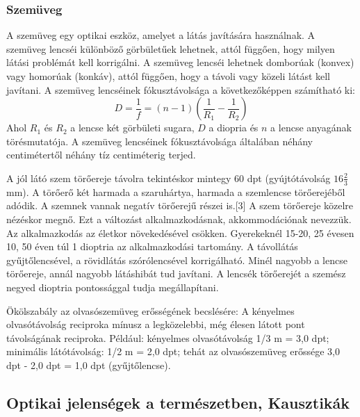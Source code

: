 \documentclass[../main.tex]{subfiles}
\begin{document}
\subsubsection{Szemüveg}
A szemüveg egy optikai eszköz, amelyet a látás javítására használnak. A szemüveg lencséi különböző görbületűek lehetnek, attól függően, hogy milyen látási problémát kell korrigálni. A szemüveg lencséi lehetnek domborúak (konvex) vagy homorúak (konkáv), attól függően, hogy a távoli vagy közeli látást kell javítani.
A szemüveg lencséinek fókusztávolsága a következőképpen számítható ki:
\begin{equation}
    D = \frac{1}{f} = (n - 1) \left(\frac{1}{R_1} - \frac{1}{R_2}\right)
\end{equation}
Ahol $R_1$ és $R_2$ a lencse két görbületi sugara, $D$ a diopria és $n$ a lencse anyagának törésmutatója. A szemüveg lencséinek fókusztávolsága általában néhány centimétertől néhány tíz centiméterig terjed.

A jól látó szem törőereje távolra tekintéskor mintegy 60 dpt (gyújtótávolság $16 \frac{2}{3}$ mm). A törőerő két harmada a szaruhártya, harmada a szemlencse törőerejéből adódik. A szemnek vannak negatív törőerejű részei is.[3] A szem törőereje közelre nézéskor megnő. Ezt a változást alkalmazkodásnak, akkommodációnak nevezzük. Az alkalmazkodás az életkor növekedésével csökken. Gyerekeknél 15-20, 25 évesen 10, 50 éven túl 1 dioptria az alkalmazkodási tartomány.
A távollátás gyűjtőlencsével, a rövidlátás szórólencsével korrigálható. Minél nagyobb a lencse törőereje, annál nagyobb látáshibát tud javítani. A lencsék törőerejét a szemész negyed dioptria pontossággal tudja megállapítani.

Ökölszabály az olvasószemüveg erősségének becslésére: A kényelmes olvasótávolság reciproka mínusz a legközelebbi, még élesen látott pont távolságának reciproka.
Például: kényelmes olvasótávolság 1/3 m = 3,0 dpt; minimális látótávolság: 1/2 m = 2,0 dpt; tehát az olvasószemüveg erőssége 3,0 dpt - 2,0 dpt = 1,0 dpt (gyűjtőlencse). 
\subsection{Optikai jelenségek a természetben, Kausztikák}
\end{document}
